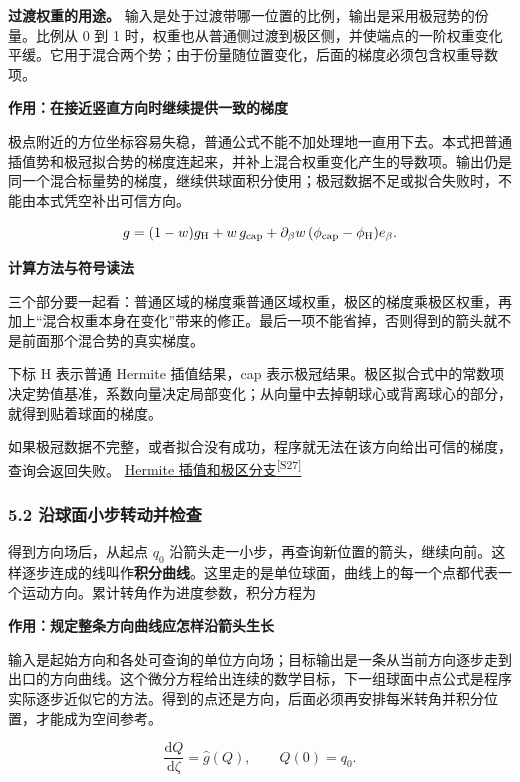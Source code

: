 \documentclass[12pt,a4paper]{article}
\numberwithin{equation}{topic}
\newcommand{\sourceref}[2]{\hyperlink{source-#1}{#2\textsuperscript{[#1]}}}
\begin{document}
\textbf{过渡权重的用途。} 输入是处于过渡带哪一位置的比例，输出是采用极冠势的份量。比例从 0 到 1 时，权重也从普通侧过渡到极区侧，并使端点的一阶权重变化平缓。它用于混合两个势；由于份量随位置变化，后面的梯度必须包含权重导数项。

\noindent\textbf{作用：在接近竖直方向时继续提供一致的梯度}\par\nobreak
极点附近的方位坐标容易失稳，普通公式不能不加处理地一直用下去。本式把普通插值势和极冠拟合势的梯度连起来，并补上混合权重变化产生的导数项。输出仍是同一个混合标量势的梯度，继续供球面积分使用；极冠数据不足或拟合失败时，不能由本式凭空补出可信方向。

\begin{equation}
\label{eq:polar}
g=(1-w)g_{\rm H}+w\,g_{\rm cap}
  +\partial_\beta w\,(\phi_{\rm cap}-\phi_{\rm H})e_\beta.
\end{equation}

\noindent\textbf{计算方法与符号读法}\par\nobreak
三个部分要一起看：普通区域的梯度乘普通区域权重，极区的梯度乘极区权重，再加上“混合权重本身在变化”带来的修正。最后一项不能省掉，否则得到的箭头就不是前面那个混合势的真实梯度。

下标 H 表示普通 Hermite 插值结果，cap 表示极冠结果。极区拟合式中的常数项决定势值基准，系数向量决定局部变化；从向量中去掉朝球心或背离球心的部分，就得到贴着球面的梯度。


如果极冠数据不完整，或者拟合没有成功，程序就无法在该方向给出可信的梯度，查询会返回失败。 \sourceref{S27}{Hermite 插值和极区分支}

\subsubsection*{5.2 沿球面小步转动并检查}

得到方向场后，从起点 \(q_0\) 沿箭头走一小步，再查询新位置的箭头，继续向前。这样逐步连成的线叫作\textbf{积分曲线}。这里走的是单位球面，曲线上的每一个点都代表一个运动方向。累计转角作为进度参数，积分方程为

\noindent\textbf{作用：规定整条方向曲线应怎样沿箭头生长}\par\nobreak
输入是起始方向和各处可查询的单位方向场；目标输出是一条从当前方向逐步走到出口的方向曲线。这个微分方程给出连续的数学目标，下一组球面中点公式是程序实际逐步近似它的方法。得到的点还是方向，后面必须再安排每米转角并积分位置，才能成为空间参考。

\begin{equation}
\label{eq:ode}
\frac{\mathrm dQ}{\mathrm d\zeta}=\hat g(Q),
\qquad Q(0)=q_0.
\end{equation}
\end{document}
